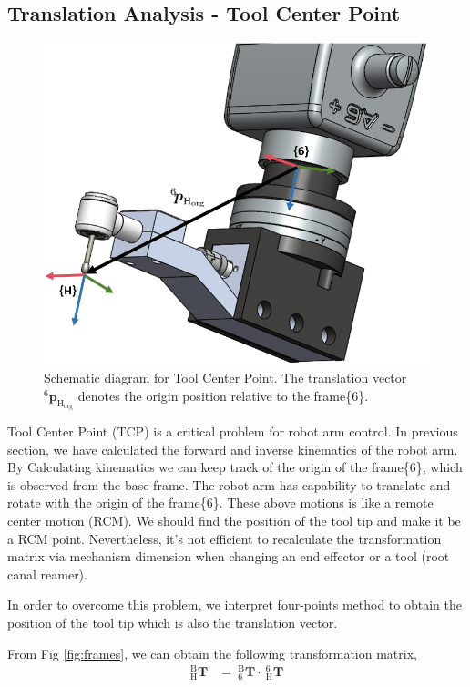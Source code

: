 \subsection{Translation Analysis - Tool Center Point}
\label{sec:tcp}
\begin{figure}[htbp]
\begin{center}
\includegraphics[width=0.7\linewidth]{Images/TCP.png}
\end{center}
\caption{
Schematic diagram for Tool Center Point. The translation vector $^\mathrm{6}\!\boldsymbol{p}_\mathrm{H_{org}}$ denotes the origin position relative to the frame\{6\}.
}\label{fig:tcp}
\end{figure}
Tool Center Point (TCP) is a critical problem for robot arm control. In previous section, we have calculated the forward and inverse kinematics of the robot arm. By Calculating kinematics we can keep track of the origin of the frame\{6\}, which is observed from the base frame. The robot arm has capability to translate and rotate with the origin of the frame\{6\}. These above motions is like a remote center motion (RCM). We should find the position of the tool tip and make it be a RCM point. Nevertheless, it's not efficient to recalculate the transformation matrix via mechanism dimension when changing an end effector or a tool (root canal reamer).
\par
In order to overcome this problem, we interpret four-points method to obtain the position of the tool tip which is also the translation vector.
\par\noindent
From Fig \ref{fig:frames}, we can obtain the following transformation matrix,
\begin{equation}
\begin{split}
_{\mathrm{H}}^{\mathrm{B}}\mathbf{T} &=\ _{\mathrm{6}}^{\mathrm{B}}\mathbf{T}\cdot \ _{\mathrm{H}}^{\mathrm{6}}\mathbf{T}\\
\end{split}
\end{equation}		
